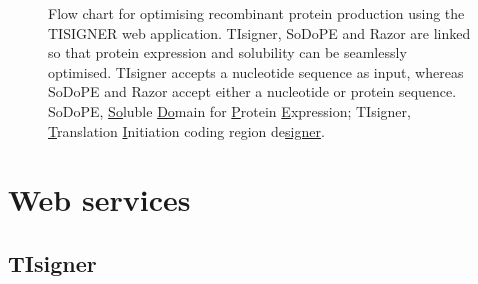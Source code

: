 \begin{figure}[!hbtp]
\begin{center}
%
\end{center}
\caption[Flow chart for optimising recombinant protein production
using the TISIGNER web application.]{Flow chart for optimising recombinant protein production
using the TISIGNER web application. TIsigner, SoDoPE and Razor are
linked so that protein expression and solubility can be seamlessly
optimised. TIsigner accepts a nucleotide sequence as input, whereas
SoDoPE and Razor accept either a nucleotide or protein sequence. SoDoPE,
\underline{So}luble \underline{Do}main for \underline{P}rotein
\underline{E}xpression; TIsigner, \underline{T}ranslation
\underline{I}nitiation coding region de\underline{signer}.}
\label{fig:nar_webserver_fig_1}
\end{figure}


\section{Web services}

\subsection{TIsigner}

